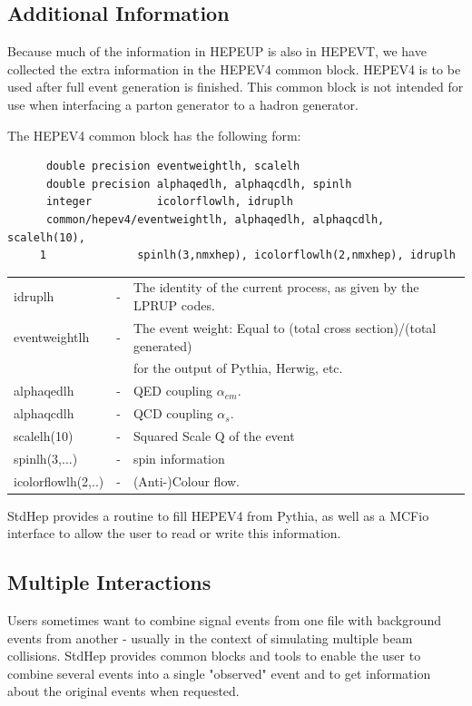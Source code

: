 \subsection { Additional Information }

Because much of the information in HEPEUP is also in HEPEVT,
we have collected the extra information in the HEPEV4 common block.
HEPEV4 is to be used after full event generation is finished.
This common block is not intended for use when interfacing a parton
generator to a hadron generator.

\noindent The HEPEV4 common block has the following form:
\begin{verbatim}
      double precision eventweightlh, scalelh
      double precision alphaqedlh, alphaqcdlh, spinlh
      integer          icolorflowlh, idruplh
      common/hepev4/eventweightlh, alphaqedlh, alphaqcdlh, scalelh(10),
     1              spinlh(3,nmxhep), icolorflowlh(2,nmxhep), idruplh
\end{verbatim}
\begin{center}
\begin{tabular}{lcl}
idruplh        &-& The identity of the current process, as given by the LPRUP codes.\\
eventweightlh  &-& The event weight: Equal to (total cross section)/(total generated)\\
               & &  for the output of Pythia, Herwig, etc. \\
alphaqedlh         &-& QED coupling $\alpha_{em}$. \\
alphaqcdlh         &-& QCD coupling $\alpha_s$. \\
scalelh(10)        &-& Squared Scale Q of the event \\
spinlh(3,...)       &-& spin information \\
icolorflowlh(2,..) &-& (Anti-)Colour flow. \\
\end{tabular}
\end{center}

StdHep provides a routine to fill HEPEV4 from Pythia, as well as a MCFio
interface to allow the user to read or write this information.

\subsection { Multiple Interactions }

Users sometimes want to combine signal events from one file with background
events from another - usually in the context of simulating multiple beam
collisions.  StdHep provides common blocks and tools to enable the user
to combine several events into a single "observed" event and to get
information about the original events when requested.

